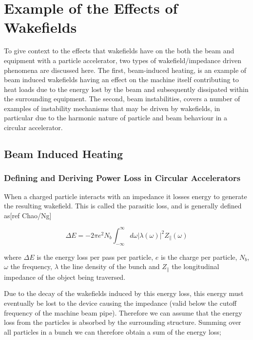 \section{Example of the Effects of Wakefields}

To give context to the effects that wakefields have on the both the beam and equipment with a particle accelerator, two types of wakefield/impedance driven phenomena are discussed here. The first, beam-induced heating, is an example of beam induced wakefields having an effect on the machine itself contributing to heat loads due to the energy lost by the beam and subsequently dissipated within the surrounding equipment. The second, beam instabilities, covers a number of examples of instability mechanisms that may be driven by wakefields, in particular due to the harmonic nature of particle and beam behaviour in a circular accelerator.

\subsection{Beam Induced Heating}
\label{sec:beam_induced_heating}
\subsubsection{Defining and Deriving Power Loss in Circular Accelerators}
\label{sec:power_loss}

When a charged particle interacts with an impedance it losses energy to generate the resulting wakefield. This is called the parasitic loss, and is generally defined as[ref Chao/Ng]

\begin{equation}
\Delta E = -2\pi e^{2}N_{b}\int^{\infty}_{-\infty} d\omega \left| \lambda \left( \omega \right)  \right|^{2} Z_{\parallel} \left( \omega \right)
\end{equation}

where $\Delta E$ is the energy loss per pass per particle, $e$ is the charge per particle, $N_{b}$, $\omega$ the frequency, $\lambda$ the line density of the bunch and $Z_{\parallel}$ the longitudinal impedance of the object being traversed.
																
Due to the decay of the wakefields induced by this energy loss, this energy must eventually be lost to the device causing the impedance (valid below the cutoff frequency of the machine beam pipe). Therefore we can assume that the energy loss from the particles is absorbed by the surrounding structure. Summing over all particles in a bunch we can therefore obtain a sum of the energy loss;

